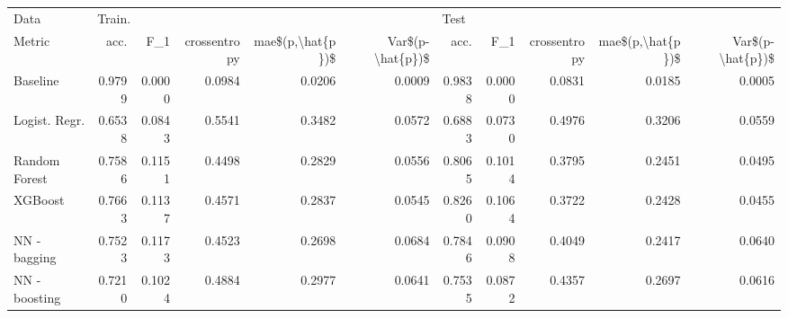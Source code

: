 \begin{tabular}{lrrrrrrrrrr}
\toprule
Data & \multicolumn{5}{l}{Train.} & \multicolumn{5}{l}{Test} \\
Metric &    acc. &     F\_1 & crossentropy & mae\$(p,\textbackslash hat\{p\})\$ & Var\$(p-\textbackslash hat\{p\})\$ &    acc. &     F\_1 & crossentropy & mae\$(p,\textbackslash hat\{p\})\$ & Var\$(p-\textbackslash hat\{p\})\$ \\
\midrule
Baseline      &  0.9799 &  0.0000 &       0.0984 &           0.0206 &           0.0009 &  0.9838 &  0.0000 &       0.0831 &           0.0185 &           0.0005 \\
Logist. Regr. &  0.6538 &  0.0843 &       0.5541 &           0.3482 &           0.0572 &  0.6883 &  0.0730 &       0.4976 &           0.3206 &           0.0559 \\
Random Forest &  0.7586 &  0.1151 &       0.4498 &           0.2829 &           0.0556 &  0.8065 &  0.1014 &       0.3795 &           0.2451 &           0.0495 \\
XGBoost       &  0.7663 &  0.1137 &       0.4571 &           0.2837 &           0.0545 &  0.8260 &  0.1064 &       0.3722 &           0.2428 &           0.0455 \\
NN - bagging  &  0.7523 &  0.1173 &       0.4523 &           0.2698 &           0.0684 &  0.7846 &  0.0908 &       0.4049 &           0.2417 &           0.0640 \\
NN - boosting &  0.7210 &  0.1024 &       0.4884 &           0.2977 &           0.0641 &  0.7535 &  0.0872 &       0.4357 &           0.2697 &           0.0616 \\
\bottomrule
\end{tabular}
